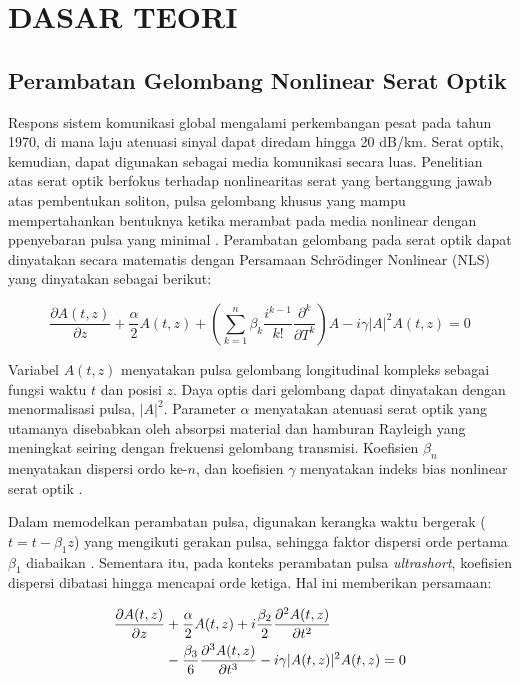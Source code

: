 \chapter{DASAR TEORI}

\section{Perambatan Gelombang Nonlinear Serat Optik}

Respons sistem komunikasi global mengalami perkembangan pesat pada tahun 1970, di mana laju atenuasi sinyal dapat diredam hingga 20 dB/km. Serat optik, kemudian, dapat digunakan sebagai media komunikasi secara luas. Penelitian atas serat optik berfokus terhadap nonlinearitas serat yang bertanggung jawab atas pembentukan soliton, pulsa gelombang khusus yang mampu mempertahankan bentuknya ketika merambat pada media nonlinear dengan ppenyebaran pulsa yang minimal . Perambatan gelombang pada serat optik dapat dinyatakan secara matematis dengan Persamaan Schr\"{o}dinger Nonlinear (NLS) yang dinyatakan sebagai berikut: 

\begin{equation}
    \label{mainNLSE}
    \frac{\partial A(t,z)}{\partial z}+\frac{\alpha}{2}A(t,z) + \left( \sum_{k=1}^n\beta_k \frac{i^{k-1}}{k!}\frac{\partial^k}{\partial T^k}\right)A - i \gamma |A|^2A(t,z) = 0
\end{equation}

Variabel \(A(t,z)\) menyatakan pulsa gelombang longitudinal kompleks sebagai fungsi waktu \(t\) dan posisi \(z\). Daya optis dari gelombang dapat dinyatakan dengan menormalisasi pulsa, \(|A|^2\). Parameter \(\alpha\) menyatakan atenuasi serat optik yang utamanya disebabkan oleh absorpsi material dan hamburan Rayleigh yang meningkat seiring dengan frekuensi gelombang transmisi. Koefisien \(\beta_n\) menyatakan dispersi ordo ke-$n$, dan koefisien $\gamma$ menyatakan indeks bias nonlinear serat optik . 

Dalam memodelkan perambatan pulsa, digunakan kerangka waktu bergerak ($t = t-\beta_1z$) yang mengikuti gerakan pulsa, sehingga faktor dispersi orde pertama $\beta_1$ diabaikan . Sementara itu, pada konteks perambatan pulsa \emph{ultrashort}, koefisien dispersi dibatasi hingga mencapai orde ketiga. Hal ini memberikan persamaan:

\begin{align}
    \label{usNLSE}
    \frac{\partial A(t,z)}{\partial z}
    &+ \frac{\alpha}{2} A(t,z) 
    + i \frac{\beta_2}{2} \frac{\partial^2 A(t,z)}{\partial t^2} \notag \\
    &-  \frac{\beta_3}{6} \frac{\partial^3 A(t,z)}{\partial t^3} 
    - i \gamma |A(t,z)|^2 A(t,z) 
    = 0
\end{align}

